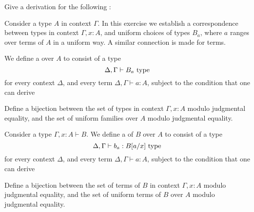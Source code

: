 \begin{exercises}
\item \label{ex:term_conversion}Give a derivation for the following :
\begin{prooftree}
\end{prooftree}
\item Consider a type $A$ in context $\Gamma$. In this exercise we establish a correspondence between types in context $\Gamma,x:A$, and uniform choices of types $B_a$, where $a$ ranges over terms of $A$ in a uniform way. A similar connection is made for terms.
  \begin{subexenum}
  \item We define a  over $A$ to consist of a type
    \begin{equation*}
      \Delta,\Gamma\vdash B_a~\type
    \end{equation*}
    for every context $\Delta$, and every term $\Delta,\Gamma\vdash a:A$, subject to the condition that one can derive
    \begin{prooftree}
    \end{prooftree}
    Define a bijection between the set of types in context $\Gamma,x:A$ modulo judgmental equality, and the set of uniform families over $A$ modulo judgmental equality. 
  \item Consider a type $\Gamma,x:A\vdash B$. We define a  of $B$ over $A$ to consist of a type
    \begin{equation*}
      \Delta,\Gamma\vdash b_a:B[a/x]~\type
    \end{equation*}
    for every context $\Delta$, and every term $\Delta,\Gamma\vdash a:A$, subject to the condition that one can derive
    \begin{prooftree}
    \end{prooftree}
    Define a bijection between the set of terms of $B$ in context $\Gamma,x:A$ modulo judgmental equality, and the set of uniform terms of $B$ over $A$ modulo judgmental equality. 
  \end{subexenum}
\end{exercises}
